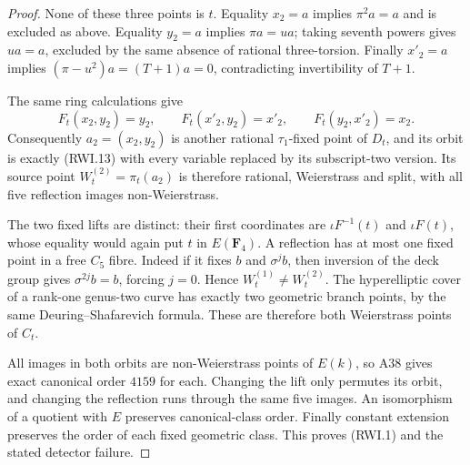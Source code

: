 \begin{proof}
None of these three points is $t$. Equality $x_2=a$
implies $\pi^2a=a$ and is excluded as above.
Equality $y_2=a$ implies $\pi a=ua$; taking seventh
powers gives $ua=a$, excluded by the same absence
of rational three-torsion. Finally $x'_2=a$
implies $(\pi-u^2)a=(T+1)a=0$, contradicting
invertibility of $T+1$.

The same ring calculations give
\[
 F_t(x_2,y_2)=y_2,\qquad
 F_t(x'_2,y_2)=x'_2,\qquad
 F_t(y_2,x'_2)=x_2.
 \tag{RWI.15}
\]
Consequently $a_2=(x_2,y_2)$ is another rational
$\tau_1$-fixed point of $D_t$, and its orbit is
exactly (RWI.13) with every variable replaced by
its subscript-two version. Its source point
$W_t^{(2)}=\pi_t(a_2)$ is therefore rational,
Weierstrass and split, with all five reflection
images non-Weierstrass.

The two fixed lifts are distinct: their first
coordinates are $\iota F^{-1}(t)$ and $\iota F(t)$,
whose equality would again put $t$ in $E(\mathbf F_4)$.
A reflection has at most one fixed point in a free
$C_5$ fibre. Indeed if it fixes $b$ and $\sigma^j b$,
then inversion of the deck group gives
$\sigma^{2j}b=b$, forcing $j=0$. Hence
$W_t^{(1)}\ne W_t^{(2)}$.
The hyperelliptic cover of a rank-one genus-two curve
has exactly two geometric branch points, by the same
Deuring--Shafarevich formula. These are therefore both
Weierstrass points of $C_t$.

All images in both orbits are non-Weierstrass points
of $E(k)$, so A38 gives exact canonical order $4159$
for each. Changing the lift only permutes its orbit,
and changing the reflection runs through the same
five images. An isomorphism of a quotient with $E$
preserves canonical-class order. Finally constant
extension preserves the order of each fixed geometric
class. This proves (RWI.1) and the stated detector failure.
\end{proof}
